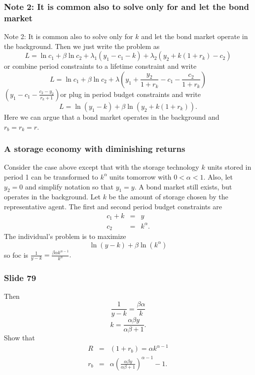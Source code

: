 \documentclass[aspectratio=169]{ltx-talk}
\begin{document}
\begin{frame}
\frametitle{Note 2: It is common also to solve only for and let the bond market}
Note 2: It is common also to solve only for $k$ and let the bond market
operate in the background. Then we just write the problem as%
\begin{equation*}
L=\ln c_{1}+\beta \ln c_{2}+\lambda _{1}\left( y_{1}-c_{1}-k\right) +\lambda
_{2}\left( y_{2}+k\left( 1+r_{k}\right) -c_{2}\right)
\end{equation*}%
or combine period constraints to a lifetime constraint and write 
\begin{equation*}
L=\ln c_{1}+\beta \ln c_{2}+\lambda \left( y_{1}+\frac{y_{2}}{1+r_{k}}-c_{1}-%
\frac{c_{2}}{1+r_{k}}\right)
\end{equation*}%
$\left( y_{1}-c_{1}-\frac{c_{2}-y_{2}}{r_{k}+1}\right) $or plug in period
budget constraints and write%
\begin{equation*}
L=\ln \left( y_{1}-k\right) +\beta \ln \left( y_{2}+k\left( 1+r_{k}\right)
\right) .
\end{equation*}%
Here we can argue that a bond market operates in the background and $%
r_{b}=r_{k}=r.$
\end{frame}

\begin{frame}
\frametitle{A storage economy with diminishing returns}
Consider the case above except that with the storage technology $k$ units
stored in period 1 can be transformed to $k^{\alpha }\;$units tomorrow with $%
0<\alpha <1$. Also, let $y_{2}=0$ and simplify notation so that $y_{1}=y.$ A
bond market still exists, but operates in the background. Let $k$ be the
amount of storage chosen by the representative agent. The first and second
period budget constraints are 
\begin{eqnarray*}
c_{1}+k &=&y \\
c_{2} &=&k^{\alpha }.
\end{eqnarray*}%
The individual's problem is to maximize 
\begin{equation*}
\ln \left( y-k\right) +\beta \ln \left( k^{\alpha }\right)
\end{equation*}%
so foc is $\frac{1}{y-k}=\frac{\beta \alpha k^{\alpha -1}}{k^{\alpha }}.$%
\end{frame}

\begin{frame}
\frametitle{Slide 79}
Then 
\begin{equation*}
\frac{1}{y-k}=\frac{\beta \alpha }{k}
\end{equation*}%
\begin{equation*}
k=\frac{\alpha \beta y}{\alpha \beta +1}.
\end{equation*}%
Show that 
\begin{eqnarray*}
R &=&\left( 1+r_{b}\right) =\alpha k^{\alpha -1} \\
r_{b} &=&\alpha \left( \frac{\alpha \beta y}{\alpha \beta +1}\right)
^{\alpha -1}-1.
\end{eqnarray*}%
$\allowbreak $

\begin{itemize}
\end{itemize}
\end{frame}
\end{document}
